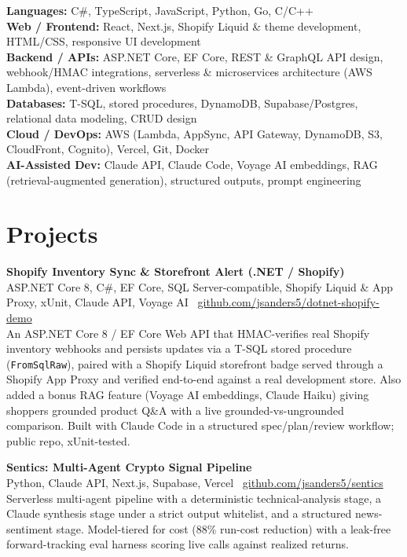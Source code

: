\documentclass[10.5pt, letterpaper]{article}
\begin{document}
\noindent\textbf{Languages: }C\#, TypeScript, JavaScript, Python, Go, C/C++\\
\textbf{Web / Frontend: }React, Next.js, Shopify Liquid \& theme development,
HTML/CSS, responsive UI development\\
\textbf{Backend / APIs: }ASP.NET Core, EF Core, REST \& GraphQL API design,
webhook/HMAC integrations, serverless \& microservices architecture (AWS
Lambda), event-driven workflows\\
\textbf{Databases: }T-SQL, stored procedures, DynamoDB, Supabase/Postgres,
relational data modeling, CRUD design\\
\textbf{Cloud / DevOps: }AWS (Lambda, AppSync, API Gateway, DynamoDB, S3,
CloudFront, Cognito), Vercel, Git, Docker\\
\textbf{AI-Assisted Dev: }Claude API, Claude Code, Voyage AI embeddings, RAG
(retrieval-augmented generation), structured outputs, prompt engineering

\section{Projects}

\noindent\textbf{Shopify Inventory Sync \& Storefront Alert (.NET / Shopify)}\\
\textcolor{muted}{\small ASP.NET Core 8, C\#, EF Core, SQL Server-compatible,
Shopify Liquid \& App Proxy, xUnit, Claude API, Voyage AI \textbullet\
\href{https://github.com/jsanders5/dotnet-shopify-demo}{github.com/jsanders5/dotnet-shopify-demo}}\\
An ASP.NET Core 8 / EF Core Web API that HMAC-verifies real Shopify
inventory webhooks and persists updates via a T-SQL stored procedure
(\texttt{FromSqlRaw}), paired with a Shopify Liquid storefront badge served
through a Shopify App Proxy and verified end-to-end against a real
development store. Also added a bonus RAG feature (Voyage AI
embeddings, Claude Haiku) giving shoppers grounded product Q\&A with a
live grounded-vs-ungrounded comparison. Built with Claude Code in a
structured spec/plan/review workflow; public repo, xUnit-tested.

\vspace{2pt}

\noindent\textbf{Sentics: Multi-Agent Crypto Signal Pipeline}\\
\textcolor{muted}{\small Python, Claude API, Next.js, Supabase, Vercel \textbullet\
\href{https://github.com/jsanders5/sentics}{github.com/jsanders5/sentics}}\\
Serverless multi-agent pipeline with a deterministic technical-analysis stage,
a Claude synthesis stage under a strict output whitelist, and a structured
news-sentiment stage. Model-tiered for cost (88\% run-cost reduction) with a
leak-free forward-tracking eval harness scoring live calls against realized
returns.
\end{document}
